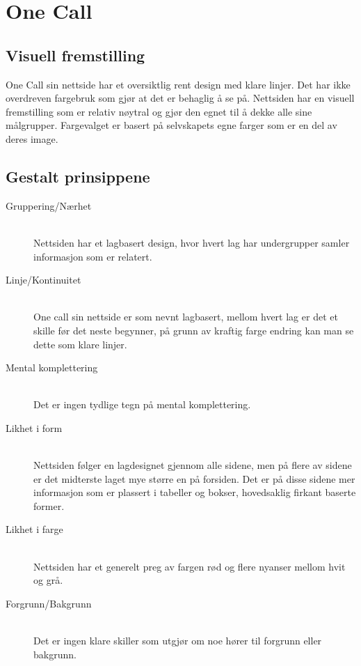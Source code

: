 \documentclass[a4paper, 10pt]{article}
\begin{document}
\newpage
\section*{One Call}
\subsection*{Visuell fremstilling}
One Call sin nettside har et oversiktlig rent design med klare linjer. Det har ikke overdreven fargebruk som gjør at det er behaglig å se på. Nettsiden har en visuell fremstilling som er relativ nøytral og gjør den egnet til å dekke alle sine målgrupper. Fargevalget er basert på selvskapets egne farger som er en del av deres image.\\


\subsection*{Gestalt prinsippene}

\begin{description}
  \item[Gruppering/Nærhet] \hfill \\
    Nettsiden har et lagbasert design, hvor hvert lag har undergrupper samler informasjon som er relatert.
  \item[Linje/Kontinuitet] \hfill \\
    One call sin nettside er som nevnt lagbasert, mellom hvert lag er det et skille før det neste begynner, på grunn av kraftig farge endring kan man se dette som klare linjer. 
  \item[Mental komplettering] \hfill \\
    Det er ingen tydlige tegn på mental komplettering.  
  \item[Likhet i form] \hfill \\
    Nettsiden følger en lagdesignet gjennom alle sidene, men på flere av sidene er det midterste laget mye større en på forsiden. Det er på disse sidene mer informasjon som er plassert i tabeller og bokser, hovedsaklig firkant baserte former.
  \item[Likhet i farge] \hfill \\
    Nettsiden har et generelt preg av fargen rød og flere nyanser mellom hvit og grå.
  \item[Forgrunn/Bakgrunn] \hfill \\
    Det er ingen klare skiller som utgjør om noe hører til forgrunn eller bakgrunn.
\end{description}
\end{document}
